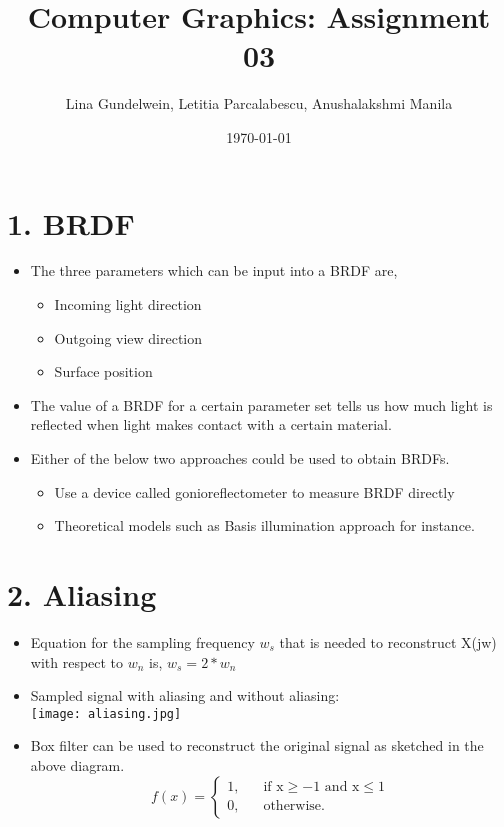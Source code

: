 \documentclass{article}
\title{Computer Graphics: Assignment 03} %
\author{Lina Gundelwein, Letitia Parcalabescu, Anushalakshmi Manila} %
\date{\today} %
\begin{document}
\maketitle 

\section*{1. BRDF} 

\begin{itemize}
\item The three parameters which can be input into a BRDF are,
\begin{itemize}
\item Incoming light direction
\item Outgoing view direction 
\item Surface position 
\end{itemize}

\item The value of a BRDF for a certain parameter set tells us how much light is reflected when light makes contact with a certain material. \\

\item Either of the below two approaches could be used to obtain BRDFs.
\begin{itemize}
	\item  Use a device called gonioreflectometer to measure BRDF directly
	\item  Theoretical models such as Basis illumination approach for instance.
\end{itemize}

\end{itemize}

\section*{2. Aliasing} 
\begin{itemize}
\item Equation for the sampling frequency $w_s$ that is needed to reconstruct X(jw) with respect to $w_n$ is, $ w_s = 2*w_n$
\item Sampled signal with aliasing and without aliasing:\\
\texttt{[image: aliasing.jpg]}\\
\item Box filter can be used to reconstruct the original signal as sketched in the above diagram.
\[   
f(x) = 
\begin{cases}
\text{1,} &\quad\text{if x} \ge-1 \text{ and x}\le1\\
\text{0,} &\quad\text{otherwise.} \ 
\end{cases}
\]

\end{itemize}
\end{document}
